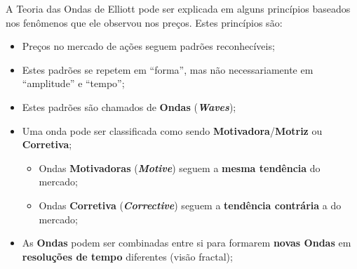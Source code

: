 \documentclass[12pt]{article}
\begin{document}



A Teoria das Ondas de Elliott pode ser explicada em alguns princípios baseados nos fenômenos
que ele observou nos preços. Estes princípios são:

\begin{itemize}
	\item Preços no mercado de ações seguem padrões reconhecíveis;
	\item Estes padrões se repetem em ``forma'', mas não necessariamente em
		  ``amplitude'' e ``tempo'';
	\item Estes padrões são chamados de \textbf{Ondas} (\textbf{\emph{Waves}});
	\item Uma onda pode ser classificada como sendo \textbf{Motivadora}/\textbf{Motriz}
		  ou \textbf{Corretiva};
	\begin{itemize}
		\item Ondas \textbf{Motivadoras} (\textbf{\emph{Motive}}) seguem a
			  \textbf{mesma tendência} do mercado;
		\item Ondas \textbf{Corretiva} (\textbf{\emph{Corrective}}) seguem a
			  \textbf{tendência contrária} a do mercado;
	\end{itemize}
	\item As \textbf{Ondas} podem ser combinadas entre si para formarem \textbf{novas Ondas}
		  em \textbf{resoluções de tempo} diferentes (visão fractal);
\end{itemize}
\end{document}
